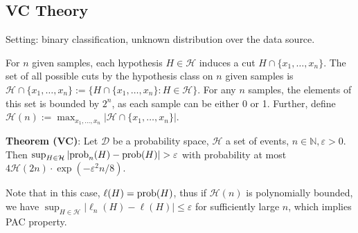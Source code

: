\subsection{VC Theory}

Setting: binary classification, unknown distribution over the data source.

For $n$ given samples, each hypothesis $H \in \mathcal{H}$ induces a cut $H \cap \{x_1, \dots, x_n\}$. The set of all possible cuts by the hypothesis class on $n$ given samples is $\mathcal{H} \cap \{x_1, \dots, x_n\}:= \{H \cap \{x_1, \dots, x_n\} : H \in \mathcal{H} \}$. For any $n$ samples, the elements of this set is bounded by $2^n$, as each sample can be either 0 or 1. Further, define $\mathcal{H}(n) := \max_{x_1, \dots, x_n} |\mathcal{H} \cap \{x_1, \dots, x_n\}|$.

\textbf{Theorem (VC)}: Let $\mathcal{D}$ be a probability space, $\mathcal{H}$ a set of events, $n \in \mathbb{N}, \varepsilon>0$. Then
$
\sup _{H \in \mathcal{H}}\left|\prob_{n}(H)-\prob(H)\right|>\varepsilon
$
with probability at most
$
4 \mathcal{H}(2 n) \cdot \exp \left(-\varepsilon^{2} n / 8\right)
$.

Note that in this case, $\ell(H)=\operatorname{prob}(H)$, thus if $\mathcal{H}(n)$ is polynomially bounded, we have $\sup _{H \in \mathcal{H}}\left|\ell_{n}(H)-\ell(H)\right| \leq \varepsilon$ for sufficiently large $n$, which implies PAC property.